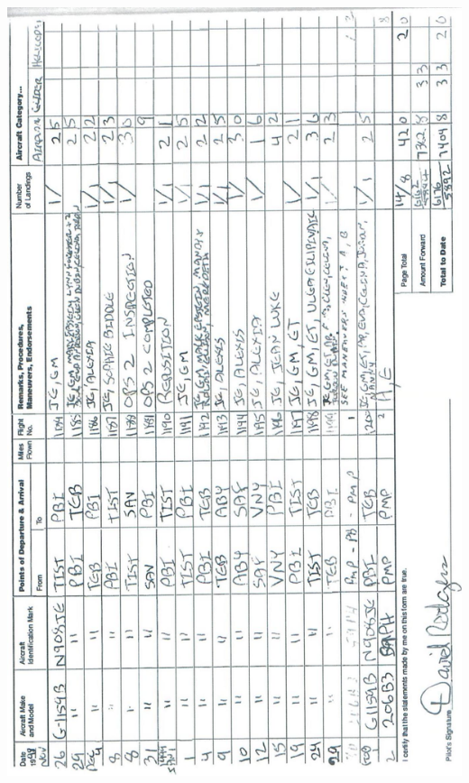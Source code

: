 \documentclass[10pt]{article}
\begin{document}
\includegraphics[max width=\textwidth, center]{2025_02_27_dd68c3d38de88f0516d9g-065}\\
\end{document}
